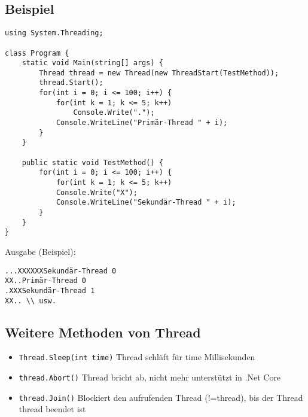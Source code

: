 \subsection{Beispiel}
\begin{lstlisting}[language={[Sharp]C}]
using System.Threading;

class Program {
	static void Main(string[] args) {
		Thread thread = new Thread(new ThreadStart(TestMethod));
		thread.Start();
		for(int i = 0; i <= 100; i++) {
			for(int k = 1; k <= 5; k++)
				Console.Write(".");
			Console.WriteLine("Primär-Thread " + i);
		}
	}

	public static void TestMethod() {
		for(int i = 0; i <= 100; i++) {
			for(int k = 1; k <= 5; k++)
			Console.Write("X");
			Console.WriteLine("Sekundär-Thread " + i);
		}
	}
}
\end{lstlisting}

Ausgabe (Beispiel):

\begin{lstlisting}[language={[Sharp]C}]
...XXXXXXSekundär-Thread 0
XX..Primär-Thread 0
.XXXSekundär-Thread 1
XX.. \\ usw.
\end{lstlisting}

\subsection{Weitere Methoden von Thread}

\begin{itemize}
\item \lstinline[language={[Sharp]C}]!Thread.Sleep(int time)! Thread schläft für time Millisekunden
\item \lstinline[language={[Sharp]C}]!thread.Abort()! Thread bricht ab, nicht mehr unterstützt in .Net Core
\item \lstinline[language={[Sharp]C}]!thread.Join()! Blockiert den aufrufenden Thread (!=thread), bis der Thread thread beendet ist
\end{itemize}